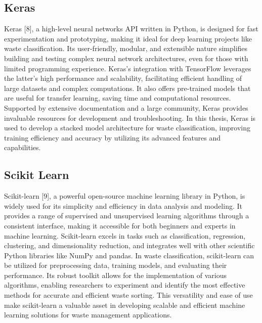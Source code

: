 \subsection{Keras}
Keras [8], a high-level neural networks API written in Python, is designed for fast experimentation and prototyping, making it ideal for deep learning projects like waste classification. Its user-friendly, modular, and extensible nature simplifies building and testing complex neural network architectures, even for those with limited programming experience. Keras's integration with TensorFlow leverages the latter’s high performance and scalability, facilitating efficient handling of large datasets and complex computations. It also offers pre-trained models that are useful for transfer learning, saving time and computational resources. Supported by extensive documentation and a large community, Keras provides invaluable resources for development and troubleshooting. In this thesis, Keras is used to develop a stacked model architecture for waste classification, improving training efficiency and accuracy by utilizing its advanced features and capabilities.

\subsection{Scikit Learn}
Scikit-learn [9], a powerful open-source machine learning library in Python, is widely used for its simplicity and efficiency in data analysis and modeling. It provides a range of supervised and unsupervised learning algorithms through a consistent interface, making it accessible for both beginners and experts in machine learning. Scikit-learn excels in tasks such as classification, regression, clustering, and dimensionality reduction, and integrates well with other scientific Python libraries like NumPy and pandas. In waste classification, scikit-learn can be utilized for preprocessing data, training models, and evaluating their performance. Its robust toolkit allows for the implementation of various algorithms, enabling researchers to experiment and identify the most effective methods for accurate and efficient waste sorting. This versatility and ease of use make scikit-learn a valuable asset in developing scalable and efficient machine learning solutions for waste management applications.

